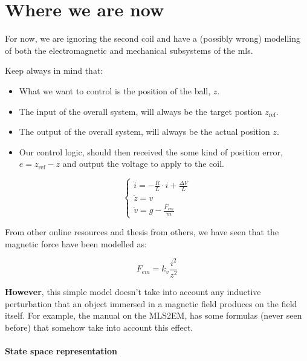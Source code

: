 \section{Where we are now}
\label{sec:where_we_are_now}

For now, we are ignoring the second coil and have a (possibly wrong) modelling of both the electromagnetic and mechanical subsystems of the \acrshort{mls}.

Keep always in mind that:
\begin{itemize}
    \item What we want to control is the position of the ball, $z$.
    \item The input of the overall system, will always be the target postion $z_{\text{ref}}$.
    \item The output of the overall system, will always be the actual position $z$.
    \item Our control logic, should then received the some kind of position error, $e = z_{\text{ref}} - z$ and output the voltage to apply to the coil.
\end{itemize}

\begin{equation}
    \begin{cases}
        \dot{i} = - \frac{R}{L} \cdot i + \frac{\Delta V}{L} \\
        \dot{z} = v                                          \\
        \dot{v} = g - \frac{F_{em}}{m}
    \end{cases}
\end{equation}

From other online resources and thesis from others, we have seen that the magnetic force have been modelled as:

\begin{equation}
    F_{em} = k_v \frac{i^2}{z^2}
\end{equation}

\textbf{However}, this simple model doesn't take into account any inductive perturbation that an object immersed in a magnetic field produces on the field itself.
For example, the manual on the MLS2EM, has some formulas (never seen before) that somehow take into account this effect.

\paragraph{State space representation}

